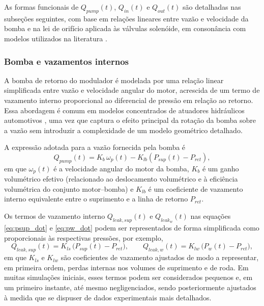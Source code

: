 As formas funcionais de $Q_{pump}(t)$, $Q_{in}(t)$ e $Q_{out}(t)$ são detalhadas nas subseções seguintes, com base em relações lineares entre vazão e velocidade da bomba e na lei de orifício aplicada às válvulas solenóide, em consonância com modelos utilizados na literatura \cite{HouhuaJing2022,ProportionalPressureABS2023,Lv2014,ChenLv2017}.

\subsubsection{Bomba e vazamentos internos}
\label{sec:controle-bomba-vazamento}

A bomba de retorno do modulador é modelada por uma relação linear simplificada entre vazão e velocidade angular do motor, acrescida de um termo de vazamento interno proporcional ao diferencial de pressão em relação ao retorno. Essa abordagem é comum em modelos concentrados de atuadores hidráulicos automotivos \cite{MotorParametricDesign2023,WangBingbing2015}, uma vez que captura o efeito principal da rotação da bomba sobre a vazão sem introduzir a complexidade de um modelo geométrico detalhado.

A expressão adotada para a vazão fornecida pela bomba é
\begin{equation}
    Q_{pump}(t) = K_b\,\omega_p(t) - K_{lb}\left(P_{sup}(t) - P_{ret}\right),
    \label{eq:qpump_2p}
\end{equation}
em que $\omega_p(t)$ é a velocidade angular do motor da bomba, $K_b$ é um ganho volumétrico efetivo (relacionado ao deslocamento volumétrico e à eficiência volumétrica do conjunto motor–bomba) e $K_{lb}$ é um coeficiente de vazamento interno equivalente entre o suprimento e a linha de retorno $P_{ret}$.

Os termos de vazamento interno $Q_{leak,sup}(t)$ e $Q_{leak_w}(t)$ nas equações \eqref{eq:psup_dot} e \eqref{eq:pw_dot} podem ser representados de forma simplificada como proporcionais às respectivas pressões, por exemplo,
\begin{equation}
    Q_{leak,sup}(t) = K_{ls}\,\big(P_{sup}(t) - P_{ret}\big), 
    \qquad
    Q_{leak,w}(t) = K_{lw}\,\big(P_{w}(t) - P_{ret}\big),
    \label{eq:leaks_2p}
\end{equation}
em que $K_{ls}$ e $K_{lw}$ são coeficientes de vazamento ajustados de modo a representar, em primeira ordem, perdas internas nos volumes de suprimento e de roda. Em muitas simulações iniciais, esses termos podem ser considerados pequenos e, em um primeiro instante, até mesmo negligenciados, sendo posteriormente ajustados à medida que se dispuser de dados experimentais mais detalhados.

